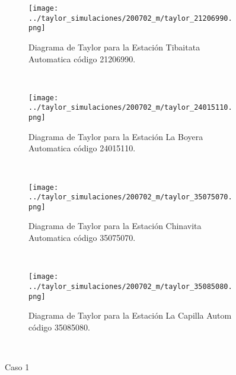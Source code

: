 \begin{figure}[H]\ContinuedFloat
\begin{subfigure}[normla]{0.5\textwidth}
\caption{Diagrama de Taylor para la Estación Tibaitata Automatica código 21206990.}
\texttt{[image: ../taylor\_simulaciones/200702\_m/taylor\_21206990.png]}
\end{subfigure}
~
\begin{subfigure}[normla]{0.5\textwidth}
\caption{Diagrama de Taylor para la Estación La Boyera Automatica código 24015110.}
\texttt{[image: ../taylor\_simulaciones/200702\_m/taylor\_24015110.png]}
\end{subfigure}
~
\begin{subfigure}[normla]{0.5\textwidth}
\caption{Diagrama de Taylor para la Estación Chinavita Automatica código 35075070.}
\texttt{[image: ../taylor\_simulaciones/200702\_m/taylor\_35075070.png]}
\end{subfigure}
~
\begin{subfigure}[normla]{0.5\textwidth}
\caption{Diagrama de Taylor para la Estación La Capilla Autom código 35085080.}
\texttt{[image: ../taylor\_simulaciones/200702\_m/taylor\_35085080.png]}
\end{subfigure}
~

    
    \caption{Caso 1 }
    \label{fig:my_label}
\end{figure}


    




